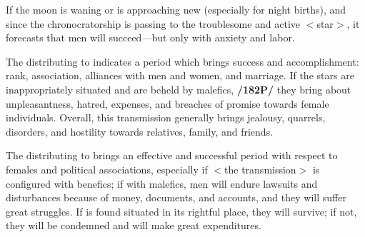 If the moon is waning or is approaching new (especially for night births), and since the chronocratorship is passing to the troublesome and active $<$star$>$, it forecasts that men will succeed—but only with anxiety and labor.

The \Moon\xspace distributing to \Venus\xspace indicates a period which brings success and accomplishment: rank,
association, alliances with men and women, and marriage. If the stars are inappropriately situated and are beheld by malefics, \textbf{/182P/} they bring about unpleasantness, hatred, expenses, and breaches of promise towards female individuals. 
Overall, this transmission generally brings jealousy, quarrels, disorders, and hostility towards relatives, family, and friends.

The \Moon\xspace distributing to \Mercury\xspace brings an effective and successful period with respect to females and
political associations, especially if $<$the transmission$>$ is configured with benefics; if with malefics, men will endure lawsuits and disturbances because of money, documents, and accounts, and they will suffer great struggles. If \Mercury\xspace is found situated in its rightful place, they will survive; if not, they will be condemned and will make great expenditures.

\newpage